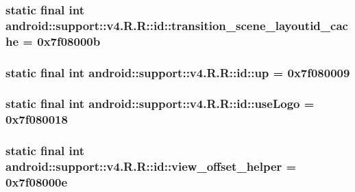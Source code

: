 \hypertarget{classandroid_1_1support_1_1v4_1_1_r_1_1id_9b24ee02b1ce88471628e84e506fd3ca}{
\subsubsection[{transition\_\-scene\_\-layoutid\_\-cache}]{\setlength{\rightskip}{0pt plus 5cm}static final int android::support::v4.R.R::id::transition\_\-scene\_\-layoutid\_\-cache = 0x7f08000b}}
\label{classandroid_1_1support_1_1v4_1_1_r_1_1id_9b24ee02b1ce88471628e84e506fd3ca}


\hypertarget{classandroid_1_1support_1_1v4_1_1_r_1_1id_7fefb00e3b06099ee3938c1413dcff6d}{
\subsubsection[{up}]{\setlength{\rightskip}{0pt plus 5cm}static final int android::support::v4.R.R::id::up = 0x7f080009}}
\label{classandroid_1_1support_1_1v4_1_1_r_1_1id_7fefb00e3b06099ee3938c1413dcff6d}


\hypertarget{classandroid_1_1support_1_1v4_1_1_r_1_1id_55134484119159c565e3be09d977105e}{
\subsubsection[{useLogo}]{\setlength{\rightskip}{0pt plus 5cm}static final int android::support::v4.R.R::id::useLogo = 0x7f080018}}
\label{classandroid_1_1support_1_1v4_1_1_r_1_1id_55134484119159c565e3be09d977105e}


\hypertarget{classandroid_1_1support_1_1v4_1_1_r_1_1id_8c10cf99a60fd6f08dbf9fefddd68c47}{
\subsubsection[{view\_\-offset\_\-helper}]{\setlength{\rightskip}{0pt plus 5cm}static final int android::support::v4.R.R::id::view\_\-offset\_\-helper = 0x7f08000e}}
\label{classandroid_1_1support_1_1v4_1_1_r_1_1id_8c10cf99a60fd6f08dbf9fefddd68c47}


